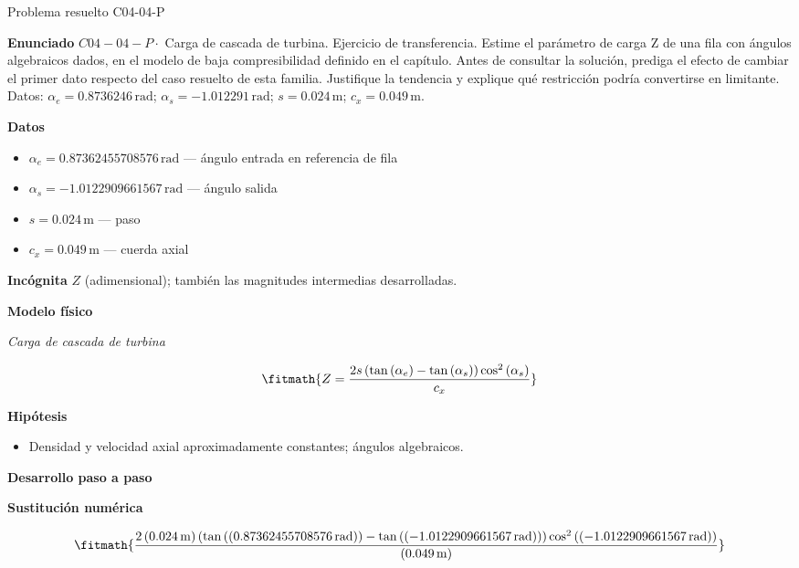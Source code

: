\documentclass[10pt,openany]{book}
\begin{document}
\begin{studiumworked}{Problema resuelto C04-04-P}


\noindent\textbf{Enunciado}
\(C04-04-P \cdot\) Carga de cascada de turbina. Ejercicio de transferencia. Estime el parámetro de carga Z de una fila con ángulos algebraicos dados, en el modelo de baja compresibilidad definido en el capítulo. Antes de consultar la solución, prediga el efecto de cambiar el primer dato respecto del caso resuelto de esta familia. Justifique la tendencia y explique qué restricción podría convertirse en limitante. Datos: \(\alpha_e=0.8736246\, \mathrm{rad}\); \(\alpha_s=-1.012291\, \mathrm{rad}\); \(s=0.024\, \mathrm{m}\); \(c_x=0.049\, \mathrm{m}\).

\noindent\textbf{Datos}
\begin{itemize}
\item $\alpha_e = 0.87362455708576\,\mathrm{rad}$ — ángulo entrada en referencia de fila
\item $\alpha_s = -1.0122909661567\,\mathrm{rad}$ — ángulo salida
\item $s = 0.024\,\mathrm{m}$ — paso
\item $c_x = 0.049\,\mathrm{m}$ — cuerda axial
\end{itemize}

\noindent\textbf{Incógnita}
$Z$ (adimensional); también las magnitudes intermedias desarrolladas.

\noindent\textbf{Modelo físico}

\noindent\textit{Carga de cascada de turbina}

\[
\fitmath{Z=\frac{2 s \left(\tan{\left(\alpha_e \right)} - \tan{\left(\alpha_s \right)}\right) \cos^{2}{\left(\alpha_s \right)}}{c_x}}
\]

\noindent\textbf{Hipótesis}
\begin{itemize}
\item Densidad y velocidad axial aproximadamente constantes; ángulos algebraicos.
\end{itemize}

\noindent\textbf{Desarrollo paso a paso}



\noindent\textbf{Sustitución numérica}

\[
\fitmath{\frac{2 \left(0.024\,\mathrm{m}\right) \left(\tan{\left(\left(0.87362455708576\,\mathrm{rad}\right) \right)} - \tan{\left(\left(-1.0122909661567\,\mathrm{rad}\right) \right)}\right) \cos^{2}{\left(\left(-1.0122909661567\,\mathrm{rad}\right) \right)}}{\left(0.049\,\mathrm{m}\right)}}
\]


\end{studiumworked}
\end{document}
